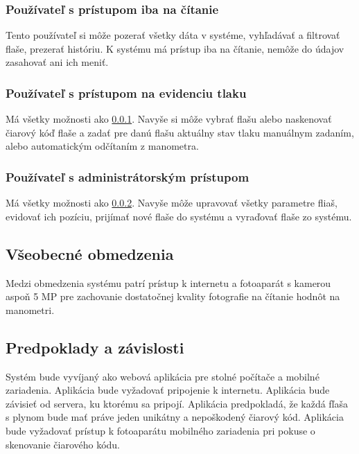 \documentclass[hreffootnote]{zah}
\begin{document}
\subsubsection{Používateľ s prístupom iba na čítanie}
\label{gen:users:ro}

Tento používateľ si môže pozerať všetky dáta v systéme, vyhľadávať a filtrovať flaše, prezerať históriu. K systému má prístup iba na čítanie, nemôže do údajov zasahovať ani ich meniť.

\subsubsection{Používateľ s prístupom na evidenciu tlaku}
\label{gen:users:meter}

Má všetky možnosti ako \ref{gen:users:ro}. Navyše si môže vybrať flašu alebo naskenovať čiarový kóď flaše a zadať pre danú flašu aktuálny stav tlaku manuálnym zadaním, alebo automatickým odčítaním z manometra.

\subsubsection{Používateľ s administrátorským prístupom}
\label{gen:users:admin}

Má všetky možnosti ako \ref{gen:users:meter}. Navyše môže upravovať všetky parametre fliaš, evidovať ich pozíciu, prijímať nové flaše do systému a vyraďovať flaše zo systému.

\subsection{Všeobecné obmedzenia}
\label{gen:constraints}

Medzi obmedzenia systému patrí prístup k internetu a fotoaparát s kamerou aspoň 5 MP pre zachovanie dostatočnej kvality fotografie na čítanie hodnôt na manometri. 

\subsection{Predpoklady a závislosti}
\label{gen:deps}

Systém bude vyvíjaný ako webová aplikácia pre stolné počítače a mobilné zariadenia. Aplikácia bude vyžadovať pripojenie k internetu. Aplikácia bude závisieť od servera, ku ktorému sa pripojí. Aplikácia predpokladá, že každá fľaša s plynom bude mať práve jeden unikátny a nepoškodený čiarový kód. Aplikácia bude vyžadovať prístup k fotoaparátu mobilného zariadenia pri pokuse o skenovanie čiarového kódu.
\end{document}
